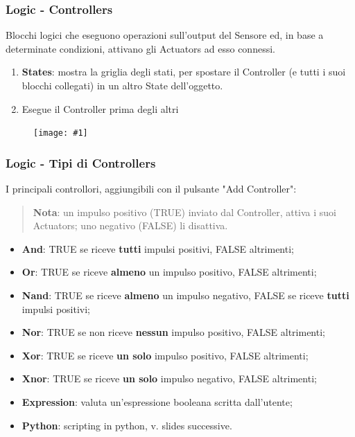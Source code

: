 \documentclass{beamer}
\def\image[#1][#2]{
	\begin{figure}[H]
		\centering
		\texttt{[image: \#1]}
\end{figure}}
\begin{document}
		\begin{frame}
			\frametitle{Logic - Controllers} %

			Blocchi logici che \textcolor{BlenderOrange}{eseguono operazioni} sull'output del Sensore ed, in base a determinate condizioni, \textcolor{BlenderOrange}{attivano gli Actuators} ad esso connessi.
			\begin{enumerate}
				\item \textbf{States}: mostra la griglia degli stati, per spostare il Controller (e tutti i suoi blocchi collegati) in un altro State dell'oggetto.
				\item Esegue il Controller prima degli altri
			\end{enumerate}
			\image[images/contr.png][scale=0.3]
		\end{frame}	
		\begin{frame}
			\frametitle{Logic - Tipi di Controllers}
			I principali controllori, aggiungibili con il pulsante "Add Controller":
			\begin{quote}
			\textcolor{BlenderOrange}{\textbf{Nota}: un impulso positivo (TRUE) inviato dal Controller, attiva i suoi Actuators; uno negativo (FALSE) li disattiva.}
			\end{quote}
			\begin{itemize}
				\item \textbf{And}: {\footnotesize TRUE se riceve \textbf{tutti} impulsi positivi, FALSE altrimenti;}
				\item \textbf{Or}: {\footnotesize TRUE se riceve \textbf{almeno} un impulso positivo, FALSE altrimenti;}
				\item \textbf{Nand}: {\footnotesize TRUE se riceve \textbf{almeno} un impulso negativo, FALSE se riceve \textbf{tutti} impulsi positivi;}
				\item \textbf{Nor}: {\footnotesize TRUE se non riceve \textbf{nessun} impulso positivo, FALSE altrimenti;}
				\item \textbf{Xor}: {\footnotesize TRUE se riceve \textbf{un solo} impulso positivo, FALSE altrimenti;}
				\item \textbf{Xnor}: {\footnotesize TRUE se riceve \textbf{un solo} impulso negativo, FALSE altrimenti;}
				\item \textbf{Expression}: {\footnotesize valuta un'espressione booleana scritta dall'utente;}
				\item \textbf{Python}: {\footnotesize scripting in python, v. slides successive.}
			\end{itemize}
		\end{frame}
		
\end{document}

